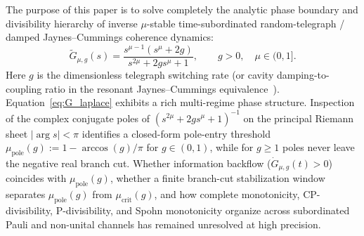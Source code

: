 \documentclass[twocolumn,10pt,amsmath,amssymb,floatfix]{revtex4-2}
\theoremstyle{plain}
\theoremstyle{definition}
\newcommand{\mupole}{\mu_{\mathrm{pole}}}
\newcommand{\mucrit}{\mu_{\mathrm{crit}}}
\begin{document}
The purpose of this paper is to solve completely the analytic phase boundary and divisibility hierarchy of inverse $\mu$-stable time-subordinated random-telegraph / damped Jaynes--Cummings coherence dynamics:
\begin{equation}
\label{eq:G_laplace}
\tilde{G}_{\mu,g}(s) = \frac{s^{\mu-1}(s^\mu + 2g)}{s^{2\mu} + 2g s^\mu + 1}, \qquad g > 0,\quad \mu \in (0,1].
\end{equation}
Here $g$ is the dimensionless telegraph switching rate (or cavity damping-to-coupling ratio in the resonant Jaynes--Cummings equivalence~\cite{Daffer2004PRA,Addis2014PRA}). Equation~\eqref{eq:G_laplace} exhibits a rich multi-regime phase structure. Inspection of the complex conjugate poles of $(s^{2\mu}+2gs^\mu+1)^{-1}$ on the principal Riemann sheet $|\arg s| < \pi$ identifies a closed-form pole-entry threshold $\mupole(g) := 1 - \arccos(g)/\pi$ for $g \in (0,1)$, while for $g \ge 1$ poles never leave the negative real branch cut. Whether information backflow ($\dot{G}_{\mu,g}(t) > 0$) coincides with $\mupole(g)$, whether a finite branch-cut stabilization window separates $\mupole(g)$ from $\mucrit(g)$, and how complete monotonicity, CP-divisibility, P-divisibility, and Spohn monotonicity organize across subordinated Pauli and non-unital channels has remained unresolved at high precision.
\end{document}
